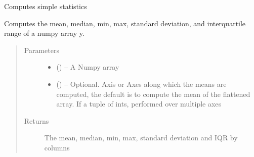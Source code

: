 \documentclass[letterpaper,10pt,english]{sphinxmanual}
\begin{document}
\begin{fulllineitems}
\label{\detokenize{Stats:pyleoclim.Stats.simpleStats}}
Computes simple statistics

Computes the mean, median, min, max, standard deviation, and interquartile
range of a numpy array y.
\begin{quote}\begin{description}
\item[{Parameters}] \leavevmode\begin{itemize}
\item {} 
 () -- A Numpy array

\item {} 
 (\sphinxstyleliteralemphasis{, }) -- Optional. Axis or Axes along which the means
are computed, the default is to compute the mean of the flattened
array. If a tuple of ints, performed over multiple axes

\end{itemize}

\item[{Returns}] \leavevmode
The mean, median, min, max, standard deviation and IQR by columns

\end{description}\end{quote}

\end{fulllineitems}

\end{document}
